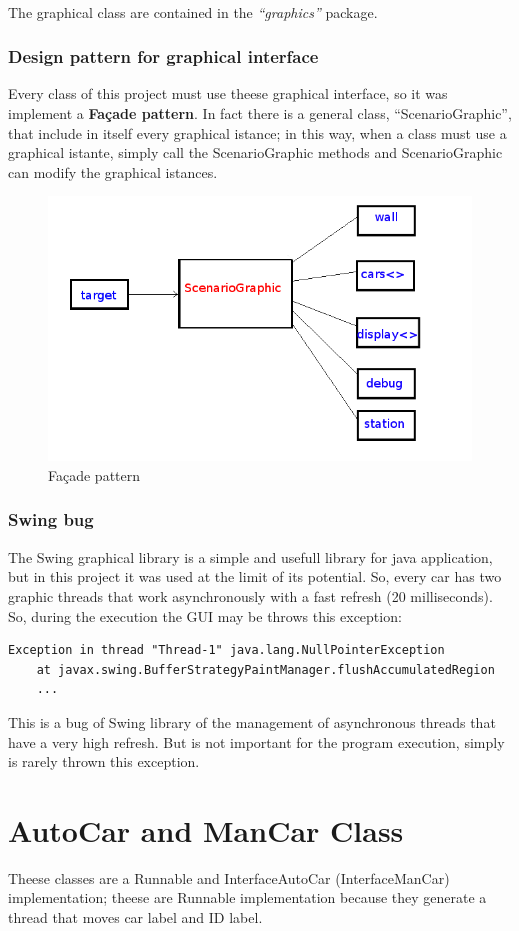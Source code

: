 \documentclass[a4paper,titlepage]{article}
\begin{document}
~

The graphical class are contained in the \textit{``graphics''} package.

\section{Design pattern for graphical interface}

Every class of this project must use theese graphical interface, so it was implement a \textbf{Façade pattern}. In fact there is a general class, ``ScenarioGraphic'', that include in itself every graphical istance; in this way, when a class must use a graphical istante, simply call the ScenarioGraphic methods and ScenarioGraphic can modify the graphical istances. 

\begin{figure}[!h]
\centering
\includegraphics[scale=0.5]{facade.png}
\caption{Façade pattern}
\end{figure}



\section{Swing bug}

The Swing graphical library is a simple and usefull library for java application, but in this project it was used at the limit of its potential. So, every car has two graphic threads that work asynchronously with a fast refresh (20 milliseconds). So, during the execution the GUI may be throws this exception: 

\begin{verbatim}
Exception in thread "Thread-1" java.lang.NullPointerException
	at javax.swing.BufferStrategyPaintManager.flushAccumulatedRegion
	...
\end{verbatim}

This is a bug of Swing library of the management of asynchronous threads that have a very high refresh. But is not important for the program execution, simply is rarely thrown this exception.


\part{AutoCar and ManCar Class}


Theese classes are a Runnable and InterfaceAutoCar (InterfaceManCar) implementation; theese are Runnable implementation because they generate a thread that moves car label and ID label. 
\end{document}
